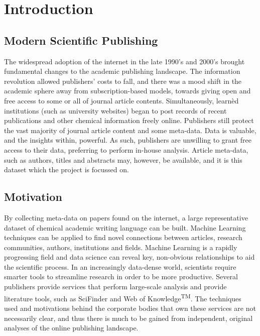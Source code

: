 \chapter{Introduction}
\section{Modern Scientific Publishing}
The widespread adoption of the internet in the late 1990’s and 2000’s brought  fundamental changes to the academic publishing landscape. The information revolution allowed publishers' costs to fall, and there was a mood shift in the academic sphere away from subscription-based models, towards giving open and free access to some or all of journal article contents.
Simultaneously, learn\`{e}d institutions (such as university websites) began to post records of recent publications and other chemical information freely online. 
Publishers still protect the vast majority of journal article content and some meta-data. Data is valuable, and the insights within, powerful. As such, publishers are unwilling to grant free access to their data, preferring to perform in-house analysis. Article meta-data, such as authors, titles and abstracts may, however, be available, and it is this dataset which the project is focussed on. 
\section{Motivation}
By collecting meta-data on papers found on the internet, a large representative dataset of chemical academic writing language can be built. Machine Learning techniques can be applied to find novel connections between articles, research communities, authors, institutions and fields. Machine Learning is a rapidly progressing field and data science can reveal key, non-obvious relationships to aid the scientific process. In an increasingly data-dense world, scientists require smarter tools to streamline research in order to be more productive. Several publishers provide services that perform large-scale analysis and provide literature tools, such as SciFinder\textsuperscript{\textregistered} and Web of Knowledge\textsuperscript{TM}. The techniques used and motivations behind the corporate bodies that own these services are not necessarily clear, and thus there is much to be gained from independent, original analyses of the online publishing landscape. 
